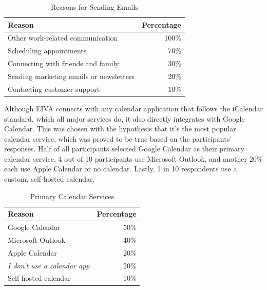 \documentclass{article}
\begin{document}
\begin{table}[!htb]
    \begin{minipage}{1\linewidth}
   	 \caption{Reasons for Sending Emails}
      \centering
        \begin{tabular}{lr}
	        \hline
            \textbf{Reason} & \textbf{Percentage} \\
            \hline
            Other work-related communication & 100\% \\
            Scheduling appointments & 70\% \\
            Connecting with friends and family & 30\% \\
            Sending marketing emails or newsletters & 20\% \\
            Contacting customer support & 10\% \\
            \hline
        \end{tabular}
    \end{minipage}%
\end{table}

Although EIVA connects with any calendar application that follows the iCalendar standard, which all major services do, it also directly integrates with Google Calendar. This was chosen with the hypothesis that it's the most popular calendar service, which was proved to be true based on the participants' responses. Half of all participants selected Google Calendar as their primary calendar service, 4 out of 10 participants use Microsoft Outlook, and another 20\% each use Apple Calendar or no calendar. Lastly, 1 in 10 respondents use a custom, self-hosted calendar.

\begin{table}[!htb]
    \begin{minipage}{1\linewidth}
   	 \caption{Primary Calendar Services}
      \centering
        \begin{tabular}{lr}
	        \hline
            \textbf{Reason} & \textbf{Percentage} \\
            \hline
            Google Calendar & 50\% \\
            Microsoft Outlook & 40\% \\
            Apple Calendar & 20\% \\
            \emph{I don't use a calendar app} & 20\% \\
            Self-hosted calendar & 10\% \\
            \hline
        \end{tabular}
    \end{minipage}%
\end{table}
\end{document}
